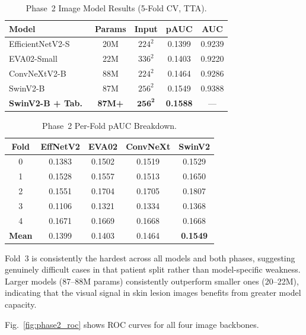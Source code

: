 \documentclass[conference]{IEEEtran}
\begin{document}
\begin{table}[!t]
  \centering
  \caption{Phase~2 Image Model Results (5-Fold CV, TTA).}
  \label{tab:phase2_summary}
  \renewcommand{\arraystretch}{1.1}
  \begin{tabular}{lcccc}
    \toprule
    \textbf{Model} & \textbf{Params} & \textbf{Input} & \textbf{pAUC} & \textbf{AUC} \\
    \midrule
    EfficientNetV2-S & 20M & $224^2$ & 0.1399 & 0.9239 \\
    EVA02-Small      & 22M & $336^2$ & 0.1403 & 0.9220 \\
    ConvNeXtV2-B     & 88M & $224^2$ & 0.1464 & 0.9286 \\
    SwinV2-B         & 87M & $256^2$ & 0.1549 & 0.9388 \\
    \textbf{SwinV2-B + Tab.}\ & \textbf{87M+} & $\mathbf{256^2}$ & \textbf{0.1588} & --- \\
    \bottomrule
  \end{tabular}
\end{table}

\begin{table}[!t]
  \centering
  \caption{Phase~2 Per-Fold pAUC Breakdown.}
  \label{tab:phase2_folds}
  \renewcommand{\arraystretch}{1.1}
  \begin{tabular}{ccccc}
    \toprule
    \textbf{Fold} & \textbf{EffNetV2} & \textbf{EVA02} & \textbf{ConvNeXt} & \textbf{SwinV2} \\
    \midrule
    0 & 0.1383 & 0.1502 & 0.1519 & 0.1529 \\
    1 & 0.1528 & 0.1557 & 0.1513 & 0.1650 \\
    2 & 0.1551 & 0.1704 & 0.1705 & 0.1807 \\
    3 & 0.1106 & 0.1321 & 0.1334 & 0.1368 \\
    4 & 0.1671 & 0.1669 & 0.1668 & 0.1668 \\
    \midrule
    \textbf{Mean} & 0.1399 & 0.1403 & 0.1464 & \textbf{0.1549} \\
    \bottomrule
  \end{tabular}
\end{table}

Fold~3 is consistently the hardest across all models and both phases,
suggesting genuinely difficult cases in that patient split rather than
model-specific weakness. Larger models (87--88M params) consistently
outperform smaller ones (20--22M), indicating that the visual signal
in skin lesion images benefits from greater model capacity.

Fig.~\ref{fig:phase2_roc} shows ROC curves for all four image
backbones.
\end{document}
